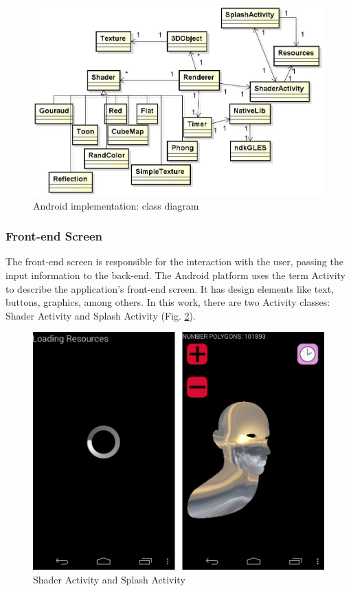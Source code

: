 \documentclass[10pt, conference, compsocconf]{IEEEtran}
\begin{document}
{	\begin{figure}[!t]
	\centering
	\includegraphics[keepaspectratio=true,scale=0.32]{figures/class_diagram.jpg}
	\caption{Android implementation: class diagram}
	\label{class_diagram}
	\end{figure}

\subsubsection{Front-end Screen}

The front-end screen is responsible for the interaction with the user, 
passing the input information to the back-end. The Android platform
uses the term Activity to describe the application's front-end screen. It has 
design elements like text, buttons, graphics, among others. In this work,
there are two Activity classes: Shader Activity and Splash Activity (Fig. \ref{shader_splash}).

	\begin{figure}[!t]
	\centering
		\includegraphics[keepaspectratio=true,scale=0.12]{figures/shader_splash.png}
	\caption{Shader Activity and Splash Activity}
	\label{shader_splash}
	\end{figure}
	
}
\end{document}
